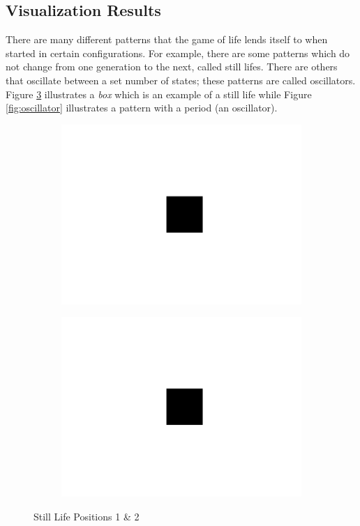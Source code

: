 \documentclass[11pt]{article}
\begin{document}
\subsection{Visualization Results}
There are many different patterns that the game of life lends itself to when started in certain configurations.  For example, there are some patterns which do not change from one generation to the next, called still lifes.  There are others that oscillate between a set number of states; these patterns are called oscillators.  Figure \ref{fig:still} illustrates a \textit{box} which is an example of a still life while Figure \ref{fig:oscillator} illustrates a pattern with a period (an oscillator).
\begin{figure}[!ht]
	\centering
	\begin{subfigure}{.45\textwidth}
		\centering
  	  	\includegraphics[width=1\linewidth]{images/box.png}
  	  	\label{fig:box1}
	\end{subfigure}
	\begin{subfigure}{.45\textwidth}
  	  	\centering
  	  	\includegraphics[width=1\linewidth]{images/box.png}
  	  	\label{fig:box2}
	\end{subfigure}
	\caption{Still Life Positions 1 \& 2}
	\label{fig:still}
\end{figure}
\end{document}
